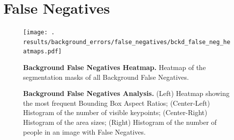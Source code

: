 \documentclass[10pt,onecolumn,letterpaper]{article}
\begin{document}
\section{False Negatives}

\begin{figure}[h!]
\centering
\texttt{[image: .\\results/background\_errors/false\_negatives/bckd\_false\_neg\_heatmaps.pdf]}
\caption{ {\small \textbf{Background False Negatives Heatmap.} Heatmap of the segmentation masks of all Background False Negatives.}}
\end{figure}

\begin{figure}[h!]
\centering
{}
\caption{ {\small \textbf{Background False Negatives Analysis.} (Left) Heatmap showing the most frequent Bounding Box Aspect Ratios;
(Center-Left) Histogram of the number of visible keypoints;
(Center-Right) Histogram of the area sizes; (Right) Histogram of the number of people in an image with False Negatives.}}
\end{figure}
\end{document}
